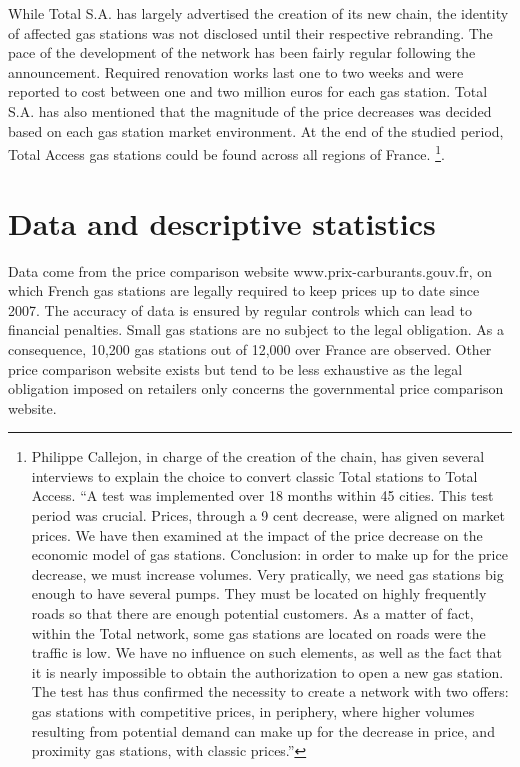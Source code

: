 \documentclass[english]{article}
\begin{document}
While Total S.A. has largely advertised the creation of its new chain, the identity of affected gas stations was not disclosed until their respective rebranding. The pace of the development of the network has been fairly regular following the announcement. Required renovation works last one to two weeks and were reported to cost between one and two million euros for each gas station. Total S.A. has also mentioned that the magnitude of the price decreases was decided based on each gas station market environment. At the end of the studied period, Total Access gas stations could be found across all regions of France.%
\footnote{Philippe Callejon, in charge of the creation of the chain, has given several interviews to explain the choice to convert classic Total stations to Total Access. ``A test was implemented over 18 months within 45 cities. This test period was crucial. Prices, through a 9 cent decrease, were aligned on market prices. We have then examined at the impact of the price decrease on the economic
model of gas stations. Conclusion: in order to make up for the price decrease, we must increase volumes. Very pratically, we need gas stations big enough to have several pumps. They must be located on highly frequently roads so that there are enough potential customers. As a matter of fact, within the Total network, some gas stations are located on roads were the traffic is low. We have no influence on
such elements, as well as the fact that it is nearly impossible to obtain the authorization to open a new gas station. The test has thus confirmed the necessity to create a network with two offers: gas stations with competitive prices, in periphery, where higher volumes resulting from potential demand can make up for the decrease in price, and proximity gas stations, with classic prices.''%
}.

\section{Data and descriptive statistics}

Data come from the price comparison website www.prix-carburants.gouv.fr, on which French gas stations are legally required to keep prices up to date since 2007. The accuracy of data is ensured by regular  controls which can lead to financial penalties. Small gas stations are no subject to the legal obligation. As a consequence, 10,200 gas stations out of 12,000 over France are observed. Other price comparison website exists but tend to be less exhaustive as the legal obligation imposed on retailers only concerns the governmental price comparison website. \medskip{}
\end{document}

